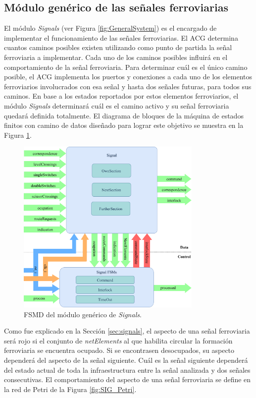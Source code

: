 \subsection{Módulo genérico de las señales ferroviarias}
	\label{sec:ACG_sig}
	
	El módulo \textit{Signals} (ver Figura \ref{fig:GeneralSystem}) es el encargado de implementar el funcionamiento de las señales ferroviarias. El ACG determina cuantos caminos posibles existen utilizando como punto de partida la señal ferroviaria a implementar. Cada uno de los caminos posibles influirá en el comportamiento de la señal ferroviaria. Para determinar cuál es el único camino posible, el ACG implementa los puertos y conexiones a cada uno de los elementos ferroviarios involucrados con esa señal y hasta dos señales futuras, para todos sus caminos. En base a los estados reportados por estos elementos ferroviarios, el módulo \textit{Signals} determinará cuál es el camino activo y su señal ferroviaria quedará definida totalmente. El diagrama de bloques de la máquina de estados finitos con camino de datos diseñado para lograr este objetivo se muestra en la Figura \ref{fig:SIG_module}.
	
	\begin{figure}[H]
		\centering
		\includegraphics[width=0.8\textwidth]{Figuras/SIG_module}
		\centering\caption{FSMD del módulo genérico de \textit{Signals}.}
		\label{fig:SIG_module}
	\end{figure}
	
	Como fue explicado en la Sección \ref{sec:signals}, el aspecto de una señal ferroviaria será rojo si el conjunto de \textit{netElements} al que habilita circular la formación ferroviaria se encuentra ocupado. Si se encontrasen desocupados, su aspecto dependerá del aspecto de la señal siguiente. Cuál es la señal siguiente dependerá del estado actual de toda la infraestructura entre la señal analizada y dos señales consecutivas. El comportamiento del aspecto de una señal ferroviaria se define en la red de Petri de la Figura \ref{fig:SIG_Petri}.
	
